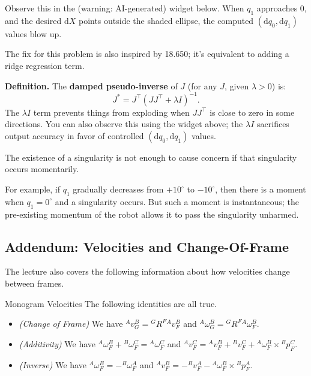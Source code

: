 Observe this in the (warning: AI-generated) widget below.
When $q_1$ approaches $0$, and the
desired $\mathrm{d}X$ points outside the shaded ellipse,
the computed $(\mathrm{d}q_0, \mathrm{d}q_1)$ values blow up.


The fix for this problem is also inspired by 18.650;
it's equivalent to adding a ridge regression term.

\textbf{Definition.}
The \textbf{damped pseudo-inverse} of $J$
(for any $J$, given $\lambda > 0$) is:
\[
    J^* = J^{\top}(JJ^{\top} + \lambda I)^{-1}.
\]
The $\lambda I$ term prevents things from exploding
when $JJ^{\top}$ is close to zero in some directions.
You can also observe this using the widget above;
the $\lambda I$ sacrifices output accuracy
in favor of controlled $(\mathrm{d}q_0, \mathrm{d}q_1)$ values.

\begin{remark}
    The existence of a singularity
    is not enough to cause concern
    if that singularity occurs momentarily.

    For example, if $q_1$ gradually decreases
    from $+10^{\circ}$ to $-10^{\circ}$,
    then there is a moment when $q_1 = 0^{\circ}$
    and a singularity occurs.  But such a moment is instantaneous;
    the pre-existing momentum of the robot
    allows it to pass the singularity unharmed.
\end{remark}

\subsection{Addendum: Velocities and Change-Of-Frame}

The lecture also covers the following information
about how velocities change between frames.

\begin{theorem}{Monogram Velocities}
    The following identities are all true.
    \begin{itemize}
        \item \emph{(Change of Frame)} We have
        ${}^Av^B_G = {}^GR^F {}^Av^B_F$ and
        ${}^A\omega^B_G = {}^GR^F {}^A\omega^B_F$.
        \item \emph{(Additivity)} We have
        ${}^A\omega^B_F + {}^B\omega^C_F = {}^A\omega^C_F$ and
        ${}^Av^C_F = {}^Av^B_F + {}^Bv^C_F
        + {}^A\omega^B_F \times {}^Bp^C_F$.
        \item \emph{(Inverse)} We have
        ${}^A\omega^B_F = -{}^B\omega^A_F$ and
        ${}^Av^B_F = -{}^Bv^A_F -
        {}^A\omega^B_F \times {}^Bp^A_F$.
    \end{itemize}
\end{theorem}

